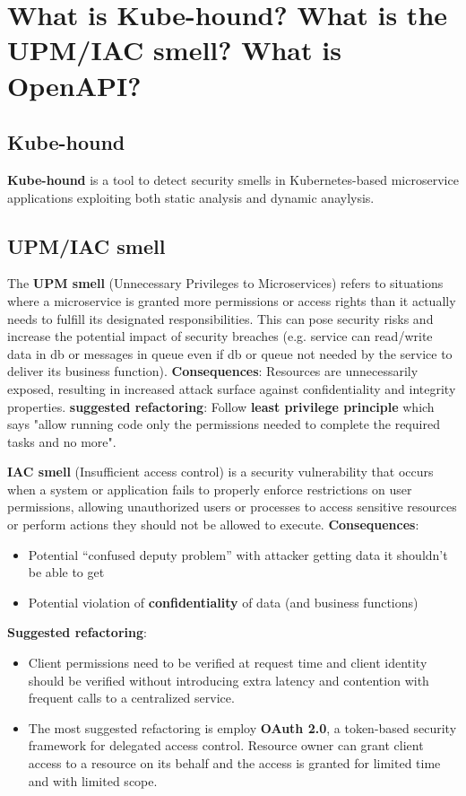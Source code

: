 \section{What is Kube-hound? What is the UPM/IAC smell? What is OpenAPI?}
\subsection{Kube-hound}
\textbf{Kube-hound} is a tool to detect security smells in Kubernetes-based microservice applications exploiting both static analysis and dynamic anaylysis.

\subsection{UPM/IAC smell}
The \textbf{UPM smell} (Unnecessary Privileges to Microservices) refers to situations where a microservice is granted more permissions or access rights than it actually needs to fulfill its designated responsibilities. This can pose security risks and increase the potential impact of security breaches (e.g. service can read/write data in db or messages in queue even if db or queue not needed by the service to deliver its business function).\nl
\textbf{Consequences}: Resources are unnecessarily exposed, resulting in increased attack surface against confidentiality and integrity properties. \nl
\textbf{suggested refactoring}: Follow \textbf{least privilege principle} which says "allow running code only the permissions needed to complete the required tasks and no more". \nl

\textbf{IAC smell} (Insufficient access control) is a security vulnerability that occurs when a system or application fails to properly enforce restrictions on user permissions, allowing unauthorized users or processes to access sensitive resources or perform actions they should not be allowed to execute. \nl \nl \nl
\textbf{Consequences}:
\begin{itemize}
   \item Potential “confused deputy problem” with attacker getting data it shouldn’t be able to get
   \item Potential violation of \textbf{confidentiality} of data (and business functions)
\end{itemize}
\textbf{Suggested refactoring}:
\begin{itemize}
   \item Client permissions need to be verified at request time and client identity should be verified without introducing extra latency and contention with frequent calls to a centralized service.
   \item The most suggested refactoring is employ \textbf{OAuth 2.0}, a token-based security framework for delegated access control. Resource owner can grant client access to a resource on its behalf and the access is granted for limited time and with limited scope.
\end{itemize}


